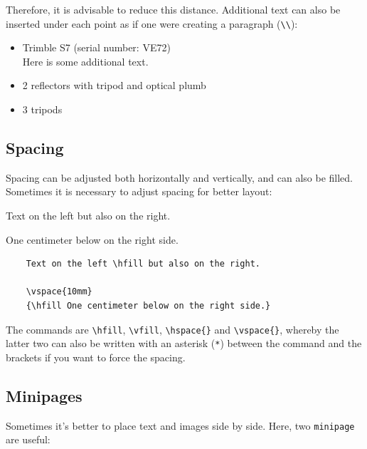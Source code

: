 Therefore, it is advisable to reduce this distance. Additional text can also be inserted under each point as if one were creating a paragraph (\verb|\\|):

\begin{itemize}	
	\setlength{\itemsep}{-2pt} %
	\item Trimble S7 (serial number: VE72)\\
	Here is some additional text.
	\item 2 reflectors with tripod and optical plumb
	\item 3 tripods
\end{itemize}


\subsection{Spacing}

Spacing can be adjusted both horizontally and vertically, and can also be filled. Sometimes it is necessary to adjust spacing for better layout:

Text on the left \hfill but also on the right.

\vspace{10mm}
{\hfill One centimeter below on the right side.}

\begin{verbatim}
    Text on the left \hfill but also on the right.

    \vspace{10mm}
    {\hfill One centimeter below on the right side.}
\end{verbatim}

The commands are \verb|\hfill|, \verb|\vfill|, \verb|\hspace{}| and \verb|\vspace{}|, whereby the latter two can also be written with an asterisk (\verb|*|) between the command and the brackets if you want to force the spacing.

\pagebreak
\subsection{Minipages}

Sometimes it's better to place text and images side by side. Here, two \verb|minipage| are useful:\\

